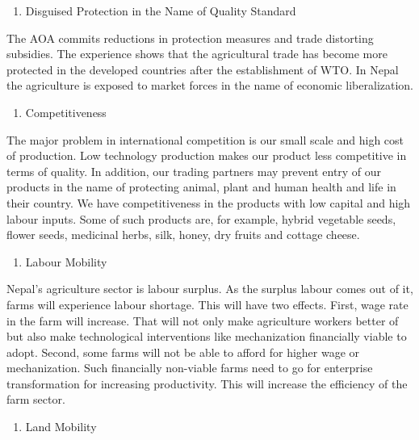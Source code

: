 \documentclass[
]{book}
\providecommand{\tightlist}{%
  \setlength{\itemsep}{0pt}\setlength{\parskip}{0pt}}
\begin{document}
\begin{enumerate}
\def\labelenumi{\arabic{enumi}.}
\setcounter{enumi}{1}
\tightlist
\item
  Disguised Protection in the Name of Quality Standard
\end{enumerate}

The AOA commits reductions in protection measures and trade distorting subsidies. The experience shows that the agricultural trade has become more protected in the developed countries after the establishment of WTO. In Nepal the agriculture is exposed to market forces in the name of economic liberalization.

\begin{enumerate}
\def\labelenumi{\arabic{enumi}.}
\setcounter{enumi}{2}
\tightlist
\item
  Competitiveness
\end{enumerate}

The major problem in international competition is our small scale and high cost of production. Low technology production makes our product less competitive in terms of quality. In addition, our trading partners may prevent entry of our products in the name of protecting animal, plant and human health and life in their country. We have competitiveness in the products with low capital and high labour inputs. Some of such products are, for example, hybrid vegetable seeds, flower seeds, medicinal herbs, silk, honey, dry fruits and cottage cheese.

\begin{enumerate}
\def\labelenumi{\arabic{enumi}.}
\setcounter{enumi}{3}
\tightlist
\item
  Labour Mobility
\end{enumerate}

Nepal's agriculture sector is labour surplus. As the surplus labour comes out of it, farms will experience labour shortage. This will have two effects. First, wage rate in the farm will increase. That will not only make agriculture workers better of but also make technological interventions like mechanization financially viable to adopt. Second, some farms will not be able to afford for higher wage or mechanization. Such financially non-viable farms need to go for enterprise transformation for increasing productivity. This will increase the efficiency of the farm sector.

\begin{enumerate}
\def\labelenumi{\arabic{enumi}.}
\setcounter{enumi}{4}
\tightlist
\item
  Land Mobility
\end{enumerate}
\end{document}
